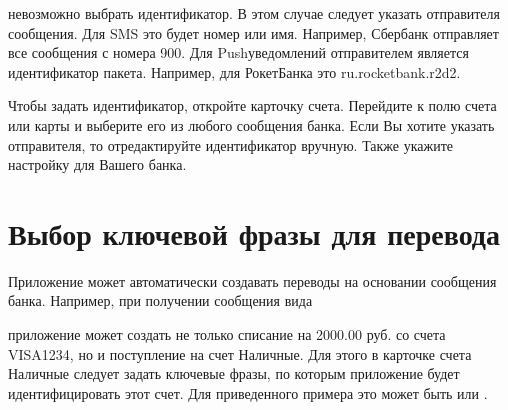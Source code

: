 \documentclass[a4paper,10pt,russian]{sphinxmanual}
\begin{document}
\sphinxAtStartPar
невозможно выбрать идентификатор. В этом случае следует указать отправителя сообщения. Для SMS это будет номер или
имя. Например, Сбербанк отправляет все сообщения с номера 900. Для Push\sphinxhyphen{}уведомлений отправителем является идентификатор пакета.
Например, для РокетБанка это ru.rocketbank.r2d2.

\sphinxAtStartPar
Чтобы задать идентификатор, откройте карточку счета. Перейдите к полю  счета или карты и выберите его из любого
сообщения банка. Если Вы хотите указать отправителя, то отредактируйте идентификатор вручную.
Также укажите настройку для Вашего банка.

\noindent{}

\noindent{}

\noindent{}

\noindent{}

\noindent{}

\noindent{}


\section{Выбор ключевой фразы для перевода}
\label{\detokenize{account-identities:id2}}
\sphinxAtStartPar
Приложение может автоматически создавать переводы на основании сообщения банка. Например, при получении сообщения вида

\begin{sphinxVerbatim}[commandchars=\\\{\}]
          
\end{sphinxVerbatim}

\sphinxAtStartPar
приложение может создать не только списание на 2000.00 руб. со счета VISA1234, но и поступление на счет Наличные. Для этого в карточке
счета Наличные следует задать ключевые фразы, по которым приложение будет идентифицировать этот счет. Для приведенного примера
это может быть  или .
\end{document}

